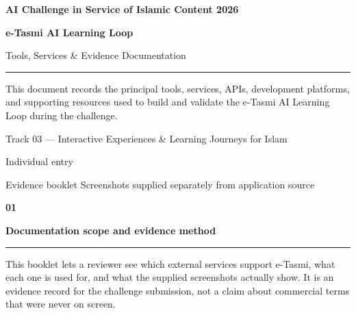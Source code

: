 \documentclass[10.5pt]{article}
\newcommand{\secno}[2]{%
  {\sffamily\bfseries\fontsize{10}{12}\selectfont\color{teal}#1}\par\vspace{0.4mm}%
  {\sffamily\bfseries\fontsize{15.5}{18}\selectfont\color{navy}#2}\par\vspace{1mm}%
  {\color{teal}\rule{\textwidth}{0.7pt}}\par\vspace{1.6mm}%
}
\begin{document}
\thispagestyle{empty}
\vspace*{28mm}
{\sffamily\bfseries\fontsize{12}{15}\selectfont\color{teal} AI Challenge in Service of Islamic Content 2026}\par
\vspace{7mm}
{\sffamily\bfseries\fontsize{28}{32}\selectfont\color{white} e-Tasmi AI Learning Loop}\par
\vspace{3mm}
{\sffamily\fontsize{16}{20}\selectfont\color{white} Tools, Services \& Evidence Documentation}\par
\vspace{8mm}
{\color{teal}\rule{42mm}{1.1pt}}\par
\vspace{7mm}
\begin{minipage}{0.86\textwidth}
{\fontsize{11.5}{16}\selectfont\color{white}
This document records the principal tools, services, APIs, development platforms, and supporting resources used to build and validate the e-Tasmi AI Learning Loop during the challenge.}
\end{minipage}
\par\vspace{18mm}
{\fontsize{11}{14}\selectfont\color{white} Track 03 --- Interactive Experiences \& Learning Journeys for Islam}\par
\vspace{2mm}
{\fontsize{10}{13}\selectfont\color{teal} Individual entry}\par
\vfill
{\fontsize{9}{12}\selectfont\color{white} Evidence booklet \quad\textbar\quad Screenshots supplied separately from application source}\par
\vspace{6mm}

\clearpage
\secno{01}{Documentation scope and evidence method}

This booklet lets a reviewer see which external services support e-Tasmi, what each one is used for, and what the supplied screenshots actually show. It is an evidence record for the challenge submission, not a claim about commercial terms that were never on screen.
\end{document}
